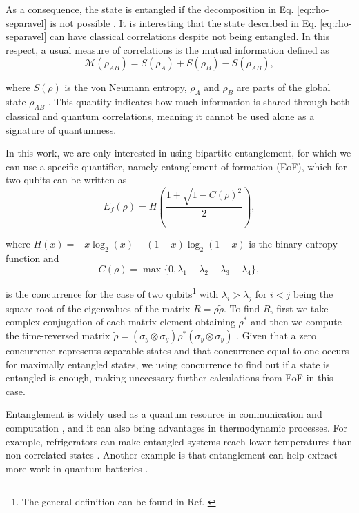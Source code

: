 \noindent As a consequence, the state is entangled if the decomposition in Eq. \eqref{eq:rho-separavel} is not possible \cite{adesso-2016}. It is interesting that the state described in Eq. \eqref{eq:rho-separavel} can have classical correlations despite not being entangled. In this respect, a usual measure of correlations is the mutual information defined as
\begin{equation}
    \mathcal{M}(\rho_{AB}) = S({\rho}_A) + S({\rho}_B) - S({\rho}_{AB}),
    \label{eq:mutual-info}
\end{equation}

\noindent where $S(\rho)$ is the von Neumann entropy, ${\rho}_A$ and ${\rho}_B$ are parts of the global state ${\rho}_{AB}$ \cite{chuang-book}. This quantity indicates how much information is shared through both classical and quantum correlations, meaning it cannot be used alone as a signature of quantumness.

In this work, we are only interested in using bipartite entanglement, for which we can use a specific quantifier, namely entanglement of formation (EoF), which for two qubits can be written as
\begin{equation}
    E_f ({\rho}) = H \left( \frac{1+\sqrt{1-C({\rho})^2}}{2} \right),
    \label{eq:eof}
\end{equation}

\noindent where $H(x) = -x\log_2(x) - (1-x)\log_2 (1-x)$ is the binary entropy function and
\begin{equation}
    C({\rho}) = \max\{ 0, \lambda_1 - \lambda_2 - \lambda_3 - \lambda_4 \},
    \label{eq:concurrence}
\end{equation}

\noindent is the concurrence for the case of two qubits\footnote{The general definition can be found in Ref. \cite{adesso-2016}} with $\lambda_i > \lambda_j$ for $i<j$ being the square root of the eigenvalues of the matrix $R = \rho \tilde{\rho}$. To find $R$, first we take complex conjugation of each matrix element obtaining $\rho^*$ and then we compute the time-reversed matrix $\tilde{\rho} = (\sigma_y \otimes \sigma_y) \rho^* (\sigma_y \otimes \sigma_y)$ \cite{rigolin-2010}. Given that a zero concurrence represents separable states and that concurrence equal to one occurs for maximally entangled states, we using concurrence to find out if a state is entangled is enough, making unecessary further calculations from EoF in this case.

Entanglement is widely used as a quantum resource in communication and computation \cite{chitambar-2019}, and it can also bring advantages in thermodynamic processes. For example, refrigerators can make entangled systems reach lower temperatures than non-correlated states \cite{alba-2026}. Another example is that entanglement can help extract more work in quantum batteries \cite{alicki-2013}.

